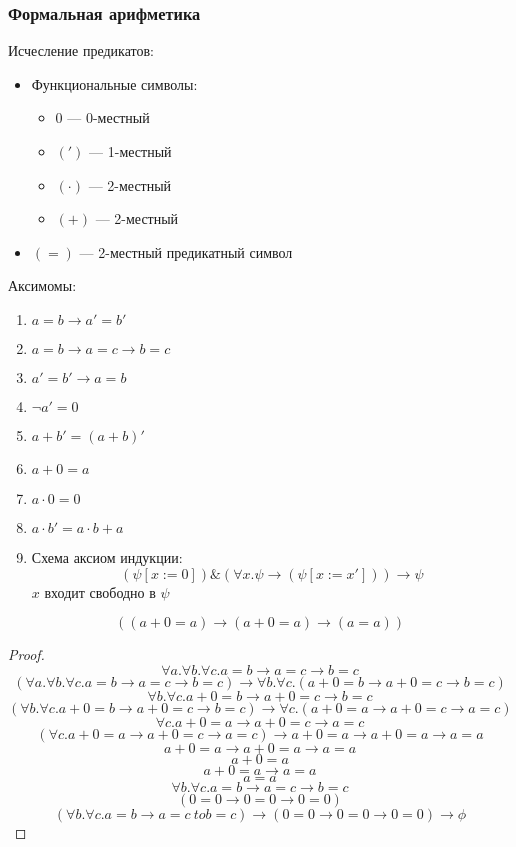 \documentclass[english]{article}
\begin{document}
\subsubsection{Формальная арифметика}
\label{sec:orgd4bf0ba}
\begin{definition}
	Исчесление предикатов:
	\begin{itemize}
		\item Функциональные символы:
		      \begin{itemize}
			      \item \(0\) --- 0-местный
			      \item \((')\) --- 1-местный
			      \item \((\cdot)\) --- 2-местный
			      \item \((+)\) --- 2-местный
		      \end{itemize}
		\item \((=)\) --- 2-местный предикатный символ
	\end{itemize}
	Аксимомы:
	\begin{enumerate}
		\item \(a = b \to a' = b'\)
		\item \(a = b \to a = c \to b = c\)
		\item \(a' = b' \to a= b\)
		\item \(\neg a' = 0\)
		\item \(a + b' = (a + b)'\)
		\item \(a + 0 = a\)
		\item \(a\cdot 0 = 0\)
		\item \(a\cdot b' = a\cdot b + a\)
		\item Схема аксиом индукции:
		      \[ (\psi[x:=0])\&(\forall x. \psi \to (\psi[x:=x'])) \to \psi \]
		      \(x\) входит свободно в \(\psi\)
	\end{enumerate}
\end{definition}
\beginproperty
\begin{property}
	\[ ((a + 0 = a) \to (a + 0 = a) \to (a = a)) \]
\end{property}
\begin{proof}
	\[ \forall a. \forall b. \forall c. a = b \to a = c \to b = c \]
	\[ (\forall a. \forall b. \forall c. a = b \to a = c \to b = c) \to \forall b. \forall c. (a + 0 = b \to a + 0 = c \to b = c) \]
	\[ \forall b. \forall c. a + 0 = b \to a + 0 = c\to b = c \]
	\[ (\forall b. \forall c. a + 0 = b \to a + 0 = c \to b = c) \to \forall c.(a + 0 = a \to a + 0 = c \to a=c) \]
	\[ \forall c. a + 0 = a \to a + 0 = c \to a = c \]
	\[ (\forall c. a + 0 = a \to a + 0 = c \to a = c) \to a+0 = a \to a + 0 = a \to a= a \]
	\[ a + 0  = a \to a + 0 = a \to a = a \]
	\[ a + 0 = a \]
	\[ a + 0 = a \to a = a \]
	\[ a = a \]
	\[ \forall b. \forall c. a = b \to a = c \to b = c \]
	\[ (0 = 0 \to 0 = 0 \to 0 = 0) \]
	\[ (\forall b. \forall c. a = b \to a = c\ to b = c) \to (0 = 0 \to 0 = 0 \to 0 = 0) \to \phi \]
	\fixme
\end{proof}
\end{document}

